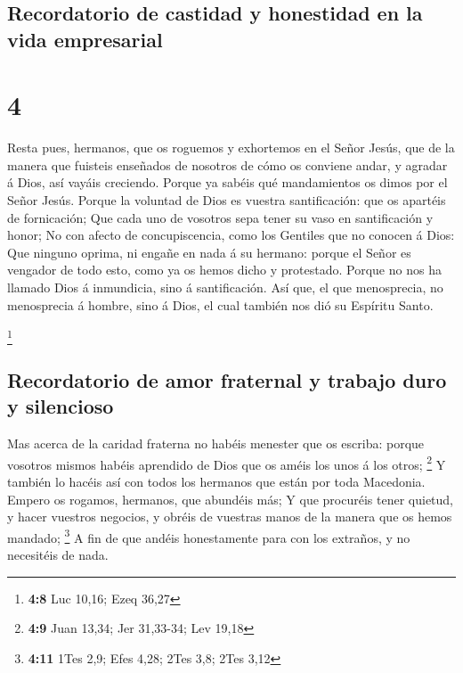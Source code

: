 \hypertarget{recordatorio-de-castidad-y-honestidad-en-la-vida-empresarial}{%
\subsection{Recordatorio de castidad y honestidad en la vida
empresarial}\label{recordatorio-de-castidad-y-honestidad-en-la-vida-empresarial}}

\hypertarget{section-3}{%
\section{4}\label{section-3}}

 Resta pues, hermanos, que os roguemos y exhortemos en el
Señor Jesús, que de la manera que fuisteis enseñados de nosotros de cómo
os conviene andar, y agradar á Dios, así vayáis creciendo. 
Porque ya sabéis qué mandamientos os dimos por el Señor Jesús.
 Porque la voluntad de Dios es vuestra santificación: que os
apartéis de fornicación;  Que cada uno de vosotros sepa
tener su vaso en santificación y honor;  No con afecto de
concupiscencia, como los Gentiles que no conocen á Dios: 
Que ninguno oprima, ni engañe en nada á su hermano: porque el Señor es
vengador de todo esto, como ya os hemos dicho y protestado. 
Porque no nos ha llamado Dios á inmundicia, sino á santificación.
 Así que, el que menosprecia, no menosprecia á hombre, sino
á Dios, el cual también nos dió su Espíritu Santo.

\footnote{\textbf{4:8} Luc 10,16; Ezeq 36,27}

\hypertarget{recordatorio-de-amor-fraternal-y-trabajo-duro-y-silencioso}{%
\subsection{Recordatorio de amor fraternal y trabajo duro y
silencioso}\label{recordatorio-de-amor-fraternal-y-trabajo-duro-y-silencioso}}

 Mas acerca de la caridad fraterna no habéis menester que os
escriba: porque vosotros mismos habéis aprendido de Dios que os améis
los unos á los otros; \footnote{\textbf{4:9} Juan 13,34; Jer 31,33-34;
  Lev 19,18}  Y también lo hacéis así con todos los
hermanos que están por toda Macedonia. Empero os rogamos, hermanos, que
abundéis más;  Y que procuréis tener quietud, y hacer
vuestros negocios, y obréis de vuestras manos de la manera que os hemos
mandado; \footnote{\textbf{4:11} 1Tes 2,9; Efes 4,28; 2Tes 3,8; 2Tes
  3,12}  A fin de que andéis honestamente para con los
extraños, y no necesitéis de nada.

